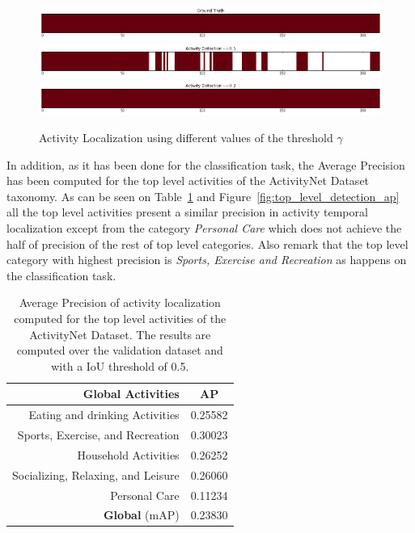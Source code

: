 \begin{figure}[ht]
\begin{center}
\includegraphics[width=1\linewidth]{img/results/activity_threshold_effect_1}
\includegraphics[width=1\linewidth]{img/results/activity_threshold_effect_2}
\includegraphics[width=1\linewidth]{img/results/activity_threshold_effect_3}
\end{center}
\caption{Activity Localization using different values of the threshold $\gamma$}
\label{fig:activty_threshold_effect}
\end{figure}

In addition, as it has been done for the classification task, the Average Precision has been computed for the top level activities of the ActivityNet Dataset taxonomy. As can be seen on Table~\ref{table:top_level_detection_ap} and Figure~\ref{fig:top_level_detection_ap} all the top level activities present a similar precision in activity temporal localization except from the category \textit{Personal Care} which does not achieve the half of precision of the rest of top level categories. Also remark that the top level category with highest precision is \textit{Sports, Exercise and Recreation} as happens on the classification task.

\begin{table}[H]
\begin{center}
\begin{tabular}{|r|c|}
\hline
\textbf{Global Activities} & \textbf{AP} \\
\hline\hline
Eating and drinking Activities & 0.25582 \\
Sports, Exercise, and Recreation & 0.30023 \\
Household Activities & 0.26252 \\
Socializing, Relaxing, and Leisure & 0.26060 \\
Personal Care & 0.11234 \\
\hline\hline
\textbf{Global} (mAP) & 0.23830 \\
\hline
\end{tabular}
\end{center}
\caption{Average Precision of activity localization computed for the top level activities of the ActivityNet Dataset. The results are computed over the validation dataset and with a IoU threshold of 0.5.}
\label{table:top_level_detection_ap}
\end{table}

